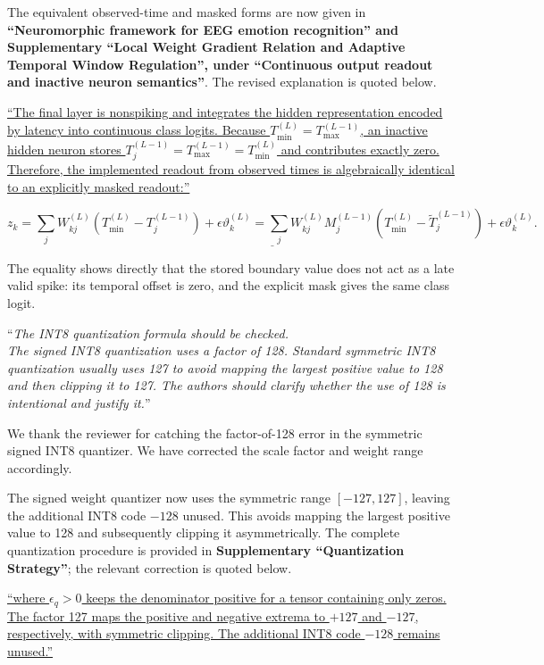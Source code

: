 \documentclass[12pt,technote,onecolumn]{IEEEtran}
\begin{document}
The equivalent observed-time and masked forms are now given in \textbf{``Neuromorphic framework for EEG emotion recognition'' and Supplementary ``Local Weight Gradient Relation and Adaptive Temporal Window Regulation'', under ``Continuous output readout and inactive neuron semantics''}. The revised explanation is quoted below.

\uline{``The final layer is nonspiking and integrates the hidden representation encoded by latency into continuous class logits. Because $T_{\min}^{(L)}=T_{\max}^{(L-1)}$, an inactive hidden neuron stores $T_j^{(L-1)}=T_{\max}^{(L-1)}=T_{\min}^{(L)}$ and contributes exactly zero. Therefore, the implemented readout from observed times is algebraically identical to an explicitly masked readout:''}

\[
\underline{\displaystyle
z_k
= \sum_j W_{kj}^{(L)}\!\left(T_{\min}^{(L)}-T_j^{(L-1)}\right)
+\epsilon\vartheta_k^{(L)}
= \sum_j W_{kj}^{(L)}M_j^{(L-1)}\!\left(T_{\min}^{(L)}-\tilde{T}_j^{(L-1)}\right)
+\epsilon\vartheta_k^{(L)}.}
\]

The equality shows directly that the stored boundary value does not act as a
late valid spike: its temporal offset is zero, and the explicit mask gives the
same class logit.

\vspace{4mm}

``{\it The INT8 quantization formula should be checked.\\
The signed INT8 quantization uses a factor of 128. Standard symmetric
INT8 quantization usually uses 127 to avoid mapping the largest positive
value to 128 and then clipping it to 127. The authors should clarify
whether the use of 128 is intentional and justify it.}''
\vspace{1mm}


We thank the reviewer for catching the factor-of-128 error in the symmetric signed INT8 quantizer. We have corrected the scale factor and weight range accordingly.

The signed weight quantizer now uses the symmetric range
\([-127,127]\), leaving the additional INT8 code \(-128\) unused.
This avoids mapping the largest positive value to 128 and subsequently
clipping it asymmetrically. The complete quantization procedure is
provided in \textbf{Supplementary ``Quantization Strategy''}; the
relevant correction is quoted below.

\uline{``where $\epsilon_q>0$ keeps the denominator positive for a tensor containing only zeros. The factor 127 maps the positive and negative extrema to $+127$ and $-127$, respectively, with symmetric clipping. The additional INT8 code $-128$ remains unused.''}
\end{document}
